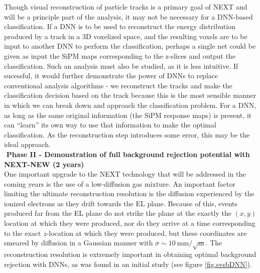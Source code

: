 \documentclass[11pt,a4paper]{article}
\begin{document}
Though visual reconstruction of particle tracks is a primary goal of NEXT and will be a principle part of the analysis, it may not be necessary for a DNN-based classification. If a DNN is to be used to reconstruct the energy distribution produced by a track in a 3D voxelized space, and the resulting voxels are to be input to another DNN to perform the classification, perhaps a single net could be given as input the SiPM maps corresponding to the z-slices and output the classification. Such an analysis must also be studied, as it is less intuitive. If sucessful, it would further demonstrate the power of DNNs to replace conventional analysis algorithms - we reconstruct the tracks and make the classification decision based on the track because this is the most sensible manner in which we can break down and approach the classification problem. For a DNN, as long as the same original information (the SiPM response maps) is present, it can ``learn'' its own way to use that information to make the optimal classification. As the reconstruction step introduces some error, this may be the ideal approach.\\

\noindent\textbf{\textbullet\,\,Phase II - Demonstration of full background rejection potential with NEXT-NEW (2 years)}\\
One important upgrade to the NEXT technology that will be addressed in the coming years is the use of a low-diffusion gas mixture. An important factor limiting the ultimate reconstruction resolution is the diffusion experienced by the ionized electrons as they drift towards the EL plane. Because of this, events produced far from the EL plane do not strike the plane at the exactly the $(x,y)$ location at which they were produced, nor do they arrive at a time corresponding to the exact $z$-location at which they were produced, but these coordinates are smeared by diffusion in a Gaussian manner with $\sigma \sim 10 ~\mathrm{mm} / \sqrt{\mathrm{m}}$. The reconstruction resolution is extremely important in obtaining optimal background rejection with DNNs, as was found in an initial study (see figure \ref{fig.svsbDNN}).
\end{document}
